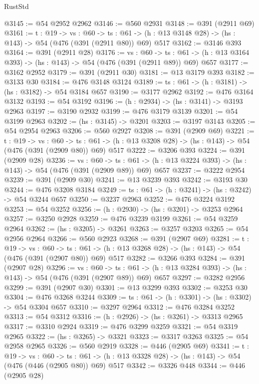 \begin{lexlean}{RustStd}
\begin{coremodule}
@3145 := @54 @2952 @2962
@3146 := @560 @2931
@3148 := @391 (@2911 @69)
@3161 := {t : @19} ->
  {vs : @60} ->
  {ts : @61} -> (h : @13 @3148 @28) -> (hs : @143) -> @54 (@476 (@391 (@2911 @80)) @69) @517
@3162 := @3146 @393
@3164 := @391 (@2911 @28)
@3176 := {vs : @60} ->
  {ts : @61} -> (h : @13 @3164 @393) -> (hs : @143) -> @54 (@476 (@391 (@2911 @89)) @69) @657
@3177 := @3162 @2952
@3179 := @391 (@2911 @30)
@3181 := @13 @3179 @393
@3182 := @3133 @30
@3184 := @476 @3148 @3124
@3189 := {ts : @61} -> (h : @3181) -> (hs : @3182) -> @54 @3184 @657
@3190 := @3177 @2962
@3192 := @476 @3164 @3132
@3193 := @54 @3192
@3196 := (h : @2934) -> (hs : @3141) -> @3193 @2963
@3197 := @3190 @2932
@3199 := @476 @3179 @3139
@3201 := @54 @3199 @2963
@3202 := (hs : @3145) -> @3201
@3203 := @3197 @3143
@3205 := @54 @2954 @2963
@3206 := @560 @2927
@3208 := @391 (@2909 @69)
@3221 := {t : @19} ->
  {vs : @60} ->
  {ts : @61} -> (h : @13 @3208 @28) -> (hs : @143) -> @54 (@476 (@391 (@2909 @80)) @69) @517
@3222 := @3206 @393
@3224 := @391 (@2909 @28)
@3236 := {vs : @60} ->
  {ts : @61} -> (h : @13 @3224 @393) -> (hs : @143) -> @54 (@476 (@391 (@2909 @89)) @69) @657
@3237 := @3222 @2954
@3239 := @391 (@2909 @30)
@3241 := @13 @3239 @393
@3242 := @3193 @30
@3244 := @476 @3208 @3184
@3249 := {ts : @61} -> (h : @3241) -> (hs : @3242) -> @54 @3244 @657
@3250 := @3237 @2963
@3252 := @476 @3224 @3192
@3253 := @54 @3252
@3256 := (h : @2930) -> (hs : @3201) -> @3253 @2964
@3257 := @3250 @2928
@3259 := @476 @3239 @3199
@3261 := @54 @3259 @2964
@3262 := (hs : @3205) -> @3261
@3263 := @3257 @3203
@3265 := @54 @2956 @2964
@3266 := @560 @2923
@3268 := @391 (@2907 @69)
@3281 := {t : @19} ->
  {vs : @60} ->
  {ts : @61} -> (h : @13 @3268 @28) -> (hs : @143) -> @54 (@476 (@391 (@2907 @80)) @69) @517
@3282 := @3266 @393
@3284 := @391 (@2907 @28)
@3296 := {vs : @60} ->
  {ts : @61} -> (h : @13 @3284 @393) -> (hs : @143) -> @54 (@476 (@391 (@2907 @89)) @69) @657
@3297 := @3282 @2956
@3299 := @391 (@2907 @30)
@3301 := @13 @3299 @393
@3302 := @3253 @30
@3304 := @476 @3268 @3244
@3309 := {ts : @61} -> (h : @3301) -> (hs : @3302) -> @54 @3304 @657
@3310 := @3297 @2964
@3312 := @476 @3284 @3252
@3313 := @54 @3312
@3316 := (h : @2926) -> (hs : @3261) -> @3313 @2965
@3317 := @3310 @2924
@3319 := @476 @3299 @3259
@3321 := @54 @3319 @2965
@3322 := (hs : @3265) -> @3321
@3323 := @3317 @3263
@3325 := @54 @2958 @2965
@3326 := @560 @2919
@3328 := @446 (@2905 @69)
@3341 := {t : @19} ->
  {vs : @60} ->
  {ts : @61} -> (h : @13 @3328 @28) -> (hs : @143) -> @54 (@476 (@446 (@2905 @80)) @69) @517
@3342 := @3326 @448
@3344 := @446 (@2905 @28)

\end{coremodule}
\end{lexlean}
